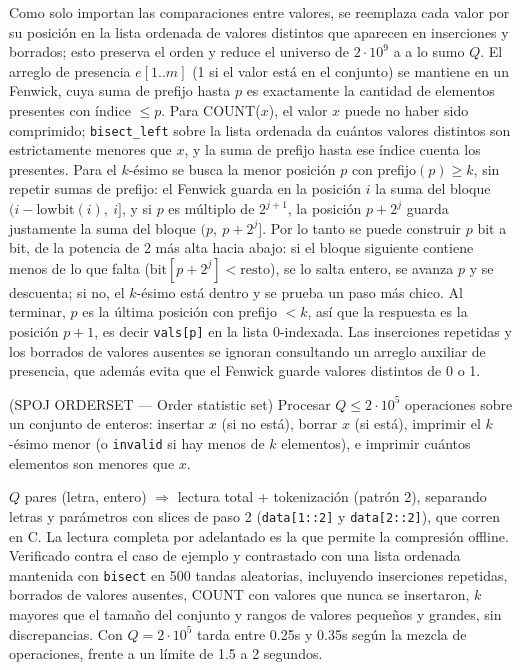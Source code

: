  Como solo importan las comparaciones entre valores, se reemplaza cada valor por su posición en la lista ordenada de valores distintos que aparecen en inserciones y borrados; esto preserva el orden y reduce el universo de $2\cdot10^9$ a a lo sumo $Q$. El arreglo de presencia $e[1..m]$ (1 si el valor está en el conjunto) se mantiene en un Fenwick, cuya suma de prefijo hasta $p$ es exactamente la cantidad de elementos presentes con índice $\le p$. Para COUNT($x$), el valor $x$ puede no haber sido comprimido; \texttt{bisect\_left} sobre la lista ordenada da cuántos valores distintos son estrictamente menores que $x$, y la suma de prefijo hasta ese índice cuenta los presentes. Para el $k$-ésimo se busca la menor posición $p$ con prefijo$(p) \ge k$, sin repetir sumas de prefijo: el Fenwick guarda en la posición $i$ la suma del bloque $(i - \text{lowbit}(i),\ i]$, y si $p$ es múltiplo de $2^{j+1}$, la posición $p + 2^j$ guarda justamente la suma del bloque $(p,\ p + 2^j]$. Por lo tanto se puede construir $p$ bit a bit, de la potencia de 2 más alta hacia abajo: si el bloque siguiente contiene menos de lo que falta ($\text{bit}[p + 2^j] < \text{resto}$), se lo salta entero, se avanza $p$ y se descuenta; si no, el $k$-ésimo está dentro y se prueba un paso más chico. Al terminar, $p$ es la última posición con prefijo $< k$, así que la respuesta es la posición $p+1$, es decir \texttt{vals[p]} en la lista 0-indexada. Las inserciones repetidas y los borrados de valores ausentes se ignoran consultando un arreglo auxiliar de presencia, que además evita que el Fenwick guarde valores distintos de 0 o 1.~\cite{fenwick1994}


(SPOJ ORDERSET — Order statistic set) Procesar $Q \le 2\cdot10^5$ operaciones sobre un conjunto de enteros: insertar $x$ (si no está), borrar $x$ (si está), imprimir el $k$-ésimo menor (o \texttt{invalid} si hay menos de $k$ elementos), e imprimir cuántos elementos son menores que $x$.

 $Q$ pares (letra, entero) $\Rightarrow$ lectura total + tokenización (patrón 2), separando letras y parámetros con slices de paso 2 (\texttt{data[1::2]} y \texttt{data[2::2]}), que corren en C. La lectura completa por adelantado es la que permite la compresión offline. Verificado contra el caso de ejemplo y contrastado con una lista ordenada mantenida con \texttt{bisect} en 500 tandas aleatorias, incluyendo inserciones repetidas, borrados de valores ausentes, COUNT con valores que nunca se insertaron, $k$ mayores que el tamaño del conjunto y rangos de valores pequeños y grandes, sin discrepancias. Con $Q = 2\cdot10^5$ tarda entre \aprox{}0.25s y \aprox{}0.35s según la mezcla de operaciones, frente a un límite de 1.5 a 2 segundos.

